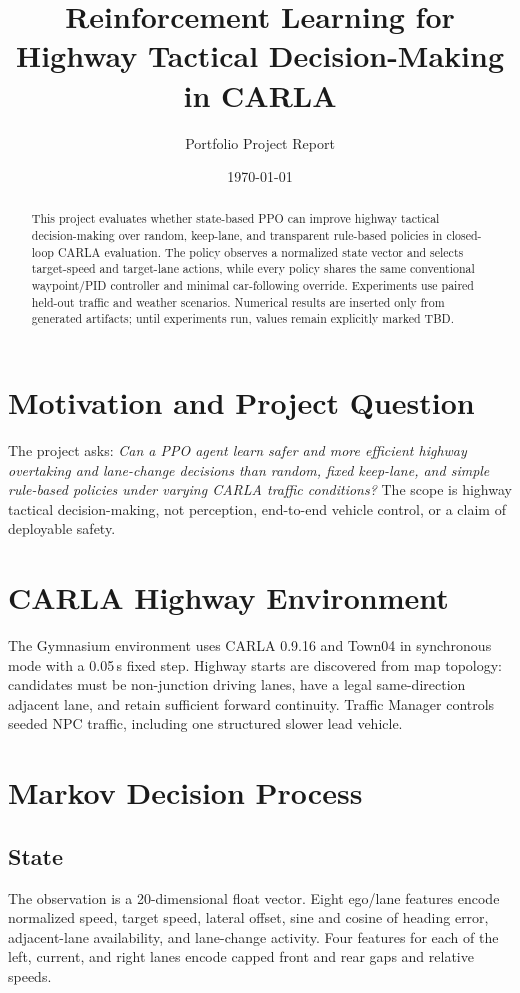 \documentclass[10pt]{article}
\title{Reinforcement Learning for Highway Tactical Decision-Making in CARLA}
\author{Portfolio Project Report}
\date{\today}
\newcommand{\CARLAVersion}{0.9.16}
\begin{document}
\maketitle

\begin{abstract}
This project evaluates whether state-based PPO can improve highway tactical
decision-making over random, keep-lane, and transparent rule-based policies in
closed-loop CARLA evaluation. The policy observes a normalized state vector and
selects target-speed and target-lane actions, while every policy shares the same
conventional waypoint/PID controller and minimal car-following override.
Experiments use paired held-out traffic and weather scenarios. Numerical
results are inserted only from generated artifacts; until experiments run,
values remain explicitly marked TBD.
\end{abstract}

\section{Motivation and Project Question}
The project asks: \emph{Can a PPO agent learn safer and more efficient highway
overtaking and lane-change decisions than random, fixed keep-lane, and simple
rule-based policies under varying CARLA traffic conditions?} The scope is
highway tactical decision-making, not perception, end-to-end vehicle control,
or a claim of deployable safety.

\section{CARLA Highway Environment}
The Gymnasium environment uses CARLA \CARLAVersion{} and Town04 in synchronous
mode with a 0.05\,s fixed step. Highway starts are discovered from map topology:
candidates must be non-junction driving lanes, have a legal same-direction
adjacent lane, and retain sufficient forward continuity. Traffic Manager
controls seeded NPC traffic, including one structured slower lead vehicle.

\section{Markov Decision Process}
\subsection{State}
The observation is a 20-dimensional float vector. Eight ego/lane features
encode normalized speed, target speed, lateral offset, sine and cosine of
heading error, adjacent-lane availability, and lane-change activity. Four
features for each of the left, current, and right lanes encode capped front and
rear gaps and relative speeds.
\end{document}
